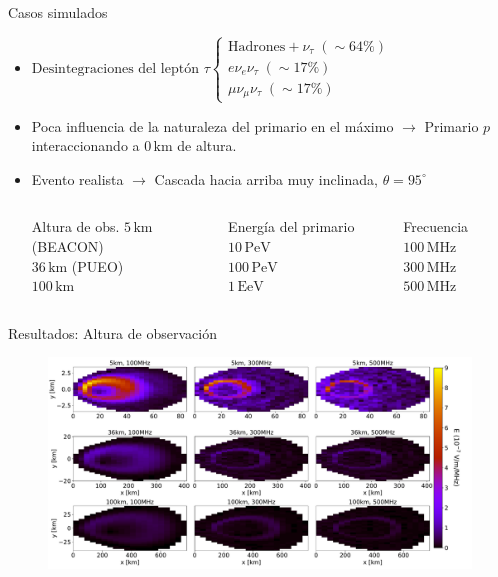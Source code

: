 \documentclass{beamer}
\begin{document}
\begin{frame}{Casos simulados}
	\begin{itemize}
		\item $\text{Desintegraciones del leptón } \tau\left\{\begin{array}{l}\text{Hadrones}+\nu_\tau\; (\sim64\%)\\e\nu_e\nu_\tau\;(\sim 17\%)\\\mu \nu_\mu\nu_\tau\;(\sim 17\%)\end{array}\right.$
		\item Poca influencia de la naturaleza del primario en el máximo $\rightarrow$ Primario $p$ interaccionando a $0\,\mathrm{km}$ de altura.
		\item Evento realista $\rightarrow$ Cascada hacia arriba muy inclinada, $\theta = 95^\circ$
		\pause\begin{columns}
			\begin{block}{\centering Altura de obs.}
				\centering $5\,\mathrm{km}$ (BEACON)\\$36\,\mathrm{km}$ (PUEO)\\$100\,\mathrm{km}$
			\end{block}
			\begin{block}{\centering Energía del primario}
				\centering $10\,\mathrm{PeV}$\\$100\,\mathrm{PeV}$\\$1\,\mathrm{EeV}$
			\end{block}

	\begin{block}{\centering Frecuencia}
		\centering $100\,\mathrm{MHz}$\\$300\,\mathrm{MHz}$\\$500\,\mathrm{MHz}$
	\end{block}
		\end{columns}
	\end{itemize}
\end{frame}

\begin{frame}{Resultados: Altura de observación}
	\begin{figure}[H]
		\centering
		\includegraphics[width=1\linewidth]{figures/Radio_UG/85deg_varh_5_36_100}
	\end{figure}
\end{frame}
\end{document}
